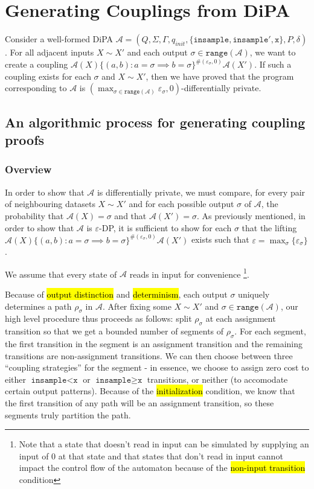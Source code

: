 \documentclass[12pt]{article}
\newcommand{\gguard}[1][x]{\texttt{insample}\geq \texttt{#1}}
\newcommand{\lguard}[1][x]{\texttt{insample} < \texttt{#1}}
\newcommand{\range}{\texttt{range}}
\theoremstyle{definition}
\begin{document}
\section{Generating Couplings from DiPA}

Consider a well-formed DiPA $\mathcal{A} = (Q, \Sigma, \Gamma, q_{init}, \{\texttt{insample},\texttt{insample}', \texttt{x}\}, P, \delta)$. For all adjacent inputs $X \sim X'$ and each output $\sigma \in \range(\mathcal{A})$, we want to create a coupling $\mathcal{A}(X)\{(a, b): a = \sigma \implies b = \sigma\}^{\#(\varepsilon_\sigma, 0)}\mathcal{A}(X')$. 
If such a coupling exists for each $\sigma$ and $X\sim X'$, then we have proved that the program corresponding to $\mathcal{A}$ is $(\max_{\sigma \in \range(\mathcal{A})}\varepsilon_\sigma, 0)$-differentially private.

\subsection{An algorithmic process for generating coupling proofs}\label{couplingStrategies}

\subsubsection{Overview}
In order to show that $\mathcal{A}$ is differentially private, we must compare, for every pair of neighbouring datasets $X\sim X'$ and for each possible output $\sigma$ of $\mathcal{A}$, the probability that $\mathcal{A}(X) = \sigma$ and that $\mathcal{A}(X') = \sigma$. 
As previously mentioned, in order to show that $\mathcal{A}$ is $\varepsilon$-DP, it is sufficient to show for each $\sigma$ that the lifting $\mathcal{A}(X)\{(a, b): a = \sigma \implies b = \sigma\}^{\#(\varepsilon_\sigma, 0)}\mathcal{A}(X')$ exists such that $\varepsilon = \max_{\sigma}\{\varepsilon_\sigma\}$.

We assume that every state of $\mathcal{A}$ reads in input for convenience
\footnote{Note that a state that doesn't read in input can be simulated by supplying an input of 0 at that state and that states that don't read in input cannot impact the control flow of the automaton because of the \hl{non-input transition} condition}.

Because of \hl{output distinction} and \hl{determinism}, each output $\sigma$ uniquely determines a path $\rho_\sigma$ in $\mathcal{A}$. After fixing some $X\sim X'$ and $\sigma \in \range(\mathcal{A})$, our high level procedure thus proceeds as follows: split $\rho_\sigma$ at each assignment transition so that we get a bounded number of segments of $\rho_\sigma$. 
For each segment, the first transition in the segment is an assignment transition and the remaining transitions are non-assignment transitions. We can then choose between three ``coupling strategies'' for the segment - in essence, we choose to assign zero cost to either $\lguard$ or $\gguard$ transitions, or neither (to accomodate certain output patterns).
Because of the \hl{initialization} condition, we know that the first transition of any path will be an assignment transition, so these segments truly partition the path.
\end{document}
